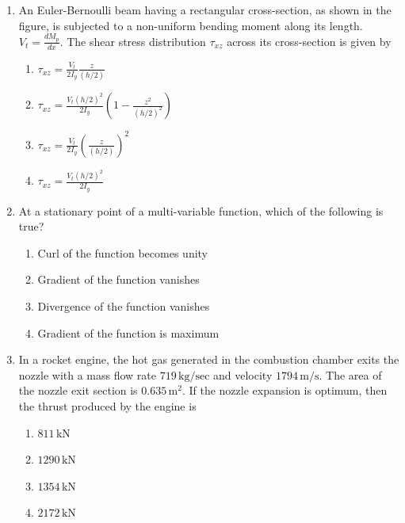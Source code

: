 \documentclass{article}
\begin{document}
\begin{enumerate}
    \item An Euler-Bernoulli beam having a rectangular cross-section, as shown in the figure, is subjected to a non-uniform bending moment along its length. $V_t = \frac{d M_p}{dx}$. The shear stress distribution $\tau_{xz}$ across its cross-section is given by
    \begin{figure}[H]
        \centering
        
        \caption{}
        \label{}
    \end{figure}
    \begin{enumerate}
        \item $\tau_{xz} = \frac{V_t}{2 I_y} \frac{z}{(h/2)}$
        \item $\tau_{xz} = \frac{V_t (h/2)^2}{2 I_y} \left( 1 - \frac{z^2}{(h/2)^2} \right)$
        \item $\tau_{xz} = \frac{V_t}{2 I_y} \left( \frac{z}{(h/2)} \right)^2$
        \item $\tau_{xz} = \frac{V_t (h/2)^2}{2 I_y}$
    \end{enumerate}
        

    \item At a stationary point of a multi-variable function, which of the following is true?
    \begin{enumerate}
        \item Curl of the function becomes unity
        \item Gradient of the function vanishes
        \item Divergence of the function vanishes
        \item Gradient of the function is maximum
    \end{enumerate}
        

    \item In a rocket engine, the hot gas generated in the combustion chamber exits the nozzle with a mass flow rate $719 \, \mathrm{kg/sec}$ and velocity $1794 \, \mathrm{m/s}$. The area of the nozzle exit section is $0.635 \, \mathrm{m}^2$. If the nozzle expansion is optimum, then the thrust produced by the engine is
    \begin{multicols}{4}
    \begin{enumerate}
        \item $811 \, \mathrm{kN}$
        \item $1290 \, \mathrm{kN}$
        \item $1354 \, \mathrm{kN}$
        \item $2172 \, \mathrm{kN}$
    \end{enumerate}
    \end{multicols}
    


\end{enumerate}
\end{document}
